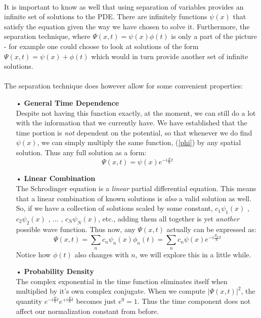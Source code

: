 \documentclass[12pt,letterpaper]{book}
\begin{document}
\paragraph*{}It is important to know as well that using separation of variables provides an infinite set of solutions to the PDE. There are infinitely functions $\psi(x)$ that satisfy the equation given the way we have chosen to solve it. Furthermore, the separation technique, where $\Psi(x,t) = \psi(x)\phi(t)$ is only a part of the picture - for example one could choose to look at solutions of the form $\Psi(x,t) = \psi(x) + \phi(t)$ which would in turn provide another set of infinite solutions. 
\paragraph*{}The separation technique does however allow for some convenient properties:
\begin{enumerate}
\item[•]\textbf{General Time Dependence}\\
Despite not having this function exactly, at the moment, we can still do a lot with the information that we currently have. We have established that the time portion is \textit{not} dependent on the potential, so that whenever we do find $\psi(x)$, we can simply multiply the same function, (\ref{phi}) by any spatial solution. Thus any full solution as a form:
\begin{equation}
\Psi(x,t) = \psi(x)e^{-i\frac{E}{\hbar}t}
\end{equation}
\item[•]\textbf{Linear Combination}\\
The Schrodinger equation is a \textit{linear} partial differential equation. This means that a linear combination of known solutions is \textit{also} a valid solution as well. So, if we have a collection of solutions scaled by some constant,
$c_1\psi_1(x)$ , $c_2\psi_2(x)$ , ... , $c_N\psi_N(x)$, etc., adding them all together is yet \textit{another} possible wave function. Thus now, any $\Psi(x,t)$ actually can be expressed as:
\begin{equation}
\label{linear combo}
\Psi(x,t) = \sum_n c_n \psi_n(x) \phi_n(t) = 
\sum_n c_n \psi(x) e^{-i\frac{E_n}{\hbar}t}
\end{equation}
Notice how $\phi(t)$ also changes with $n$, we will explore this in a little while. 
\item[•]\textbf{Probability Density}\\
The complex exponential in the time function eliminates itself when multiplied by it's own complex conjugate. When we compute $\big | \Psi(x,t) \big|^2$, the quantity $e^{-i\frac{E}{\hbar}t}e^{+i\frac{E}{\hbar}t}$ becomes just $e^0 = 1$. Thus the time component does not affect our normalization constant from before. 
\end{enumerate}
\end{document}
